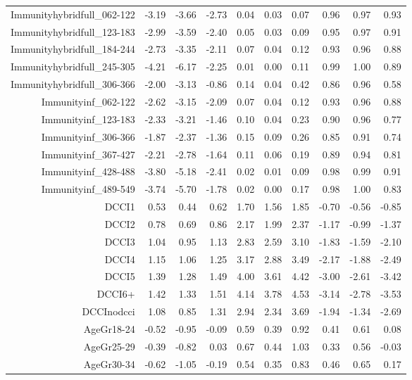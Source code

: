 \begin{table}[ht]
\begin{tabular}{rrrrrrrrrr}
  Immunityhybridfull\_062-122 & -3.19 & -3.66 & -2.73 & 0.04 & 0.03 & 0.07 & 0.96 & 0.97 & 0.93 \\ 
  Immunityhybridfull\_123-183 & -2.99 & -3.59 & -2.40 & 0.05 & 0.03 & 0.09 & 0.95 & 0.97 & 0.91 \\ 
  Immunityhybridfull\_184-244 & -2.73 & -3.35 & -2.11 & 0.07 & 0.04 & 0.12 & 0.93 & 0.96 & 0.88 \\ 
  Immunityhybridfull\_245-305 & -4.21 & -6.17 & -2.25 & 0.01 & 0.00 & 0.11 & 0.99 & 1.00 & 0.89 \\ 
  Immunityhybridfull\_306-366 & -2.00 & -3.13 & -0.86 & 0.14 & 0.04 & 0.42 & 0.86 & 0.96 & 0.58 \\ 
  Immunityinf\_062-122 & -2.62 & -3.15 & -2.09 & 0.07 & 0.04 & 0.12 & 0.93 & 0.96 & 0.88 \\ 
  Immunityinf\_123-183 & -2.33 & -3.21 & -1.46 & 0.10 & 0.04 & 0.23 & 0.90 & 0.96 & 0.77 \\ 
  Immunityinf\_306-366 & -1.87 & -2.37 & -1.36 & 0.15 & 0.09 & 0.26 & 0.85 & 0.91 & 0.74 \\ 
  Immunityinf\_367-427 & -2.21 & -2.78 & -1.64 & 0.11 & 0.06 & 0.19 & 0.89 & 0.94 & 0.81 \\ 
  Immunityinf\_428-488 & -3.80 & -5.18 & -2.41 & 0.02 & 0.01 & 0.09 & 0.98 & 0.99 & 0.91 \\ 
  Immunityinf\_489-549 & -3.74 & -5.70 & -1.78 & 0.02 & 0.00 & 0.17 & 0.98 & 1.00 & 0.83 \\ 
  DCCI1 & 0.53 & 0.44 & 0.62 & 1.70 & 1.56 & 1.85 & -0.70 & -0.56 & -0.85 \\ 
  DCCI2 & 0.78 & 0.69 & 0.86 & 2.17 & 1.99 & 2.37 & -1.17 & -0.99 & -1.37 \\ 
  DCCI3 & 1.04 & 0.95 & 1.13 & 2.83 & 2.59 & 3.10 & -1.83 & -1.59 & -2.10 \\ 
  DCCI4 & 1.15 & 1.06 & 1.25 & 3.17 & 2.88 & 3.49 & -2.17 & -1.88 & -2.49 \\ 
  DCCI5 & 1.39 & 1.28 & 1.49 & 4.00 & 3.61 & 4.42 & -3.00 & -2.61 & -3.42 \\ 
  DCCI6+ & 1.42 & 1.33 & 1.51 & 4.14 & 3.78 & 4.53 & -3.14 & -2.78 & -3.53 \\ 
  DCCInodcci & 1.08 & 0.85 & 1.31 & 2.94 & 2.34 & 3.69 & -1.94 & -1.34 & -2.69 \\ 
  AgeGr18-24 & -0.52 & -0.95 & -0.09 & 0.59 & 0.39 & 0.92 & 0.41 & 0.61 & 0.08 \\ 
  AgeGr25-29 & -0.39 & -0.82 & 0.03 & 0.67 & 0.44 & 1.03 & 0.33 & 0.56 & -0.03 \\ 
  AgeGr30-34 & -0.62 & -1.05 & -0.19 & 0.54 & 0.35 & 0.83 & 0.46 & 0.65 & 0.17 \\ 

\end{tabular}
\end{table}
